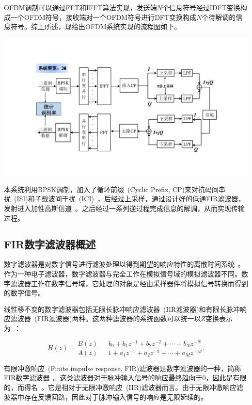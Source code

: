 \documentclass[a4paper,11pt,onecolumn,twoside]{article}
\begin{document}
OFDM调制可以通过FFT和IFFT算法实现，发送端$N$个信息符号经过IDFT变换构成一个OFDM符号，接收端对一个OFDM符号进行DFT变换构成$N$个待解调的信息符号。综上所述，现给出OFDM系统实现的流程图如下。

\begin{center}
    \includegraphics[width=1\textwidth]{system.pdf}
\end{center}

本系统利用BPSK调制，加入了循环前缀~(Cyclic Prefix, CP)来对抗码间串扰~(ISI)和子载波间干扰~(ICI)~\supercite{wiki,ta}，后经过上采样，通过设计好的低通FIR滤波器，发射进入加性高斯信道~\supercite{ta}。之后经过一系列逆过程完成信息的解调，从而实现传输过程。

\subsection{FIR数字滤波器概述}
数字滤波器是对数字信号进行滤波处理以得到期望的响应特性的离散时间系统~\supercite{wiki}。作为一种电子滤波器，数字滤波器与完全工作在模拟信号域的模拟滤波器不同。数字滤波器工作在数字信号域，它处理的对象是经由采样器件将模拟信号转换而得到的数字信号。

线性移不变的数字滤波器包括无限长脉冲响应滤波器~(IIR滤波器)和有限长脉冲响应滤波器~(FIR滤波器)两种。这两种滤波器的系统函数可以统一以$Z$变换表示为~\supercite{textbook}：

\begin{equation}
H(z) = \frac{B(z)}{A(z)} = \frac{b_0+b_1 z^{-1}+b_2 z^{-2}+\cdots +b_N z^{-N}}{1+a_1 z^{-1}+a_2 z^{-2}+\cdots +a_M z^{-M}}.
\end{equation}

有限冲激响应~(Finite impulse response, FIR)滤波器是数字滤波器的一种，简称FIR数字滤波器~\supercite{course1}。这类滤波器对于脉冲输入信号的响应最终趋向于0，因此是有限的，而得名~\supercite{wiki,course1}。它是相对于无限冲激响应~(IIR)滤波器而言。由于无限冲激响应滤波器中存在反馈回路，因此对于脉冲输入信号的响应是无限延续的。
\end{document}
